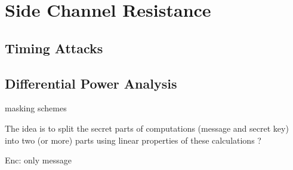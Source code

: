 \chapter{Side Channel Resistance}

\section{Timing Attacks}

\section{Differential Power Analysis}


\cite{reparaz2015}

masking schemes \cite{oder2016}

The idea is to split the secret parts of computations (message and secret key) into two (or more) parts
using linear properties of these calculations ?

Enc: only message 


